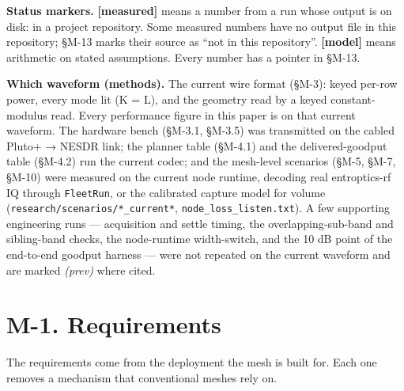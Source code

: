 \documentclass[10pt,letterpaper,twocolumn]{article}
\begin{document}
\textbf{Status markers.} \textbf{{[}measured{]}} means a number from a run whose output is on disk: in a project repository. Some measured numbers have no output file in this repository; §M-13 marks their source as ``not in this repository''. \textbf{{[}model{]}} means arithmetic on stated assumptions. Every number has a pointer in §M-13.

\textbf{Which waveform (methods).} The current wire format (§M-3): keyed per-row power, every mode lit (K = L), and the geometry read by a keyed constant-modulus read. Every performance figure in this paper is on that current waveform. The hardware bench (§M-3.1, §M-3.5) was transmitted on the cabled Pluto+ → NESDR link; the planner table (§M-4.1) and the delivered-goodput table (§M-4.2) run the current codec; and the mesh-level scenarios (§M-5, §M-7, §M-10) were measured on the current node runtime, decoding real entroptics-rf IQ through \texttt{FleetRun}, or the calibrated capture model for volume (\texttt{research/\allowbreak{}scenarios/\allowbreak{}*\allowbreak{}\_\allowbreak{}current*\allowbreak{}}, \texttt{node\_\allowbreak{}loss\_\allowbreak{}listen.\allowbreak{}txt}). A few supporting engineering runs --- acquisition and settle timing, the overlapping-sub-band and sibling-band checks, the node-runtime width-switch, and the 10 dB point of the end-to-end goodput harness --- were not repeated on the current waveform and are marked \emph{(prev)} where cited.

\section{M-1. Requirements}\label{m-1-requirements}

The requirements come from the deployment the mesh is built for. Each one removes a mechanism that conventional meshes rely on.
\end{document}
